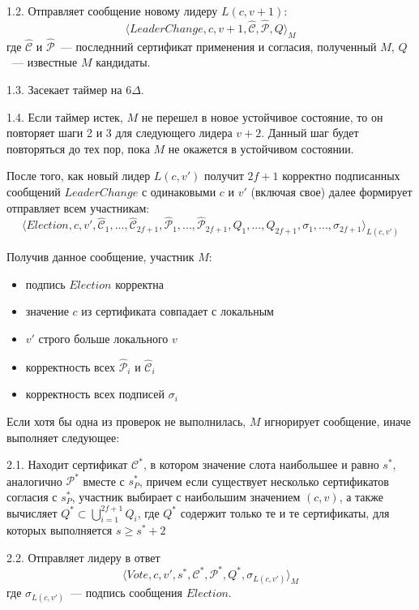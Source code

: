 1.2. Отправляет сообщение новому лидеру $L(c, v+1)$:
\[ \langle LeaderChange, c, v+1,  \hat{\mathcal{C}}, \hat{\mathcal{P}}, Q \rangle_M \]
где $\hat{\mathcal{C}}$ и $\hat{\mathcal{P}}$~--- последнний сертификат применения и согласия, полученный $M$, $Q$~--- известные $M$ кандидаты.

1.3. Засекает таймер на $6\Delta$.

1.4. Если таймер истек, $M$ не перешел в новое устойчивое состояние, то он повторяет шаги 2 и 3 для следующего лидера $v+2$. Данный шаг будет повторяться до тех пор, пока $M$ не окажется в устойчивом состоянии.
\vspace{10pt}

После того, как новый лидер $L(c, v')$ получит $2f+1$ корректно подписанных сообщений $LeaderChange$ с одинаковыми $c$ и $v'$  (включая свое) далее формирует отправляет всем участникам:
\[ \langle Election, c, v', \hat{\mathcal{C}}_1,...,\hat{\mathcal{C}}_{2f+1}, \hat{\mathcal{P}}_1,...,\hat{\mathcal{P}}_{2f+1}, Q_1,..., Q_{2f+1}, \sigma_1,..., \sigma_{2f+1}\rangle_{L(c, v')} \]

Получив данное сообщение, участник $M$:
\begin{itemize}
\item подпись $Election$ корректна
\item значение $c$ из сертификата совпадает с локальным
\item $v'$ строго больше локального $v$
\item корректность всех $\hat{\mathcal{P}}_i$ и $\hat{\mathcal{C}}_i$
\item корректность всех подписей $\sigma_i$
\end{itemize}
Если хотя бы одна из проверок не выполнилась, $M$ игнорирует сообщение, иначе выполняет следующее:

2.1. Находит сертификат $\mathcal{C}^{*}$, в котором значение слота наибольшее и равно $s^{*}$, аналогично $\mathcal{P}^{*}$ вместе с  $s_P^{*}$, причем если существует несколько сертификатов согласия с $s_P^{*}$, участник выбирает с наибольшим значением $(c, v)$, а также вычисляет $Q^{*} \subset \bigcup\limits_{i=1}^{2f+1} Q_i$, где $Q^{*}$ содержит только те и те сертификаты, для которых выполняется $s \ge s^{*}+2$

2.2. Отправляет лидеру в ответ
\[ \langle Vote, c, v', s^{*}, \mathcal{C}^{*}, \mathcal{P}^{*}, Q^{*}, \sigma_{L(c, v')} \rangle_M \]
где $\sigma_{L(c, v')}$~--- подпись сообщения $Election$.
\vspace{10pt}

